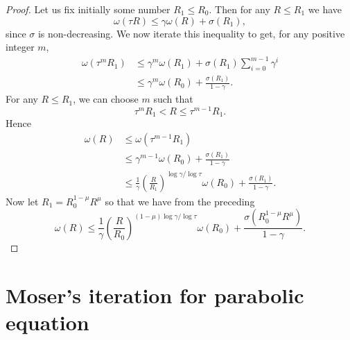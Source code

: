 \begin{proof}
	Let us fix initially some number $R_1\leq R_0$.
	Then for any $R\leq R_1$ we have
	\[
		\omega(\tau R) \leq \gamma \omega(R) + \sigma(R_1),
	\]
	since $\sigma$ is non-decreasing. 
	We now iterate this inequality to get,
	for any positive integer $m$,
	\begin{align*}
		\omega(\tau^mR_1)
			&\leq \gamma^m\omega(R_1) + \sigma(R_1)\sum_{i=0}^{m-1}\gamma^i\\
			&\leq \gamma^m\omega(R_0) + \frac{\sigma(R_1)}{1-\gamma}.
	\end{align*}	
	For any $R\leq R_1$, we can choose $m$ such that
	\[
		\tau^mR_1<R\leq\tau^{m-1}R_1.
	\]
	Hence
	\begin{align*}
		\omega(R) &\leq \omega(\tau^{m-1}R_1)\\
			&\leq \gamma^{m-1}\omega(R_0) + \frac{\sigma(R_1)}{1-\gamma}\\
			&\leq \frac{1}{\gamma}\left(\frac{R}{R_1}\right)^{\log\gamma/\log\tau}\omega(R_0)
				+ \frac{\sigma(R_1)}{1-\gamma}.
	\end{align*}
	Now let $R_1=R_0^{1-\mu}R^{\mu}$ so that we have from the preceding
	\[
		\omega(R) \leq \frac{1}{\gamma}\left(\frac{R}{R_0}\right)^{(1-\mu)\log\gamma/\log\tau}\omega(R_0)
		+ \frac{\sigma(R_0^{1-\mu}R^\mu)}{1-\gamma}.
	\]
\end{proof}


\section{Moser's iteration for parabolic equation}

